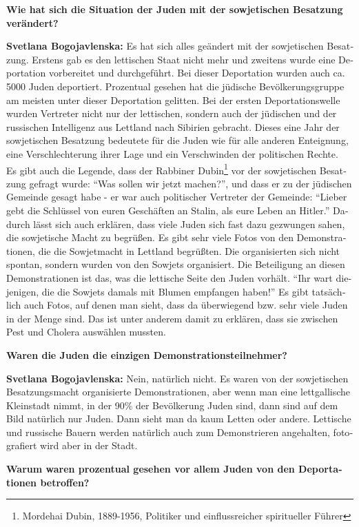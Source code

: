 \begin{otherlanguage}{ngerman}
\textbf{Wie hat sich die Situation der Juden mit der sowjetischen Besatzung verändert?}

\textbf{Svetlana Bogojavlenska:} Es hat sich alles geändert mit der sowjetischen Besatzung. Erstens gab es den lettischen Staat nicht mehr und zweitens wurde eine Deportation vorbereitet und durchgeführt. Bei dieser Deportation wurden auch ca. 5000 Juden deportiert. Prozentual gesehen hat die jüdische Bevölkerungsgruppe am meisten unter dieser Deportation gelitten. Bei der ersten Deportationswelle wurden Vertreter nicht nur der lettischen, sondern auch der jüdischen und der russischen Intelligenz aus Lettland nach Sibirien gebracht. Dieses eine Jahr der sowjetischen Besatzung bedeutete für die Juden wie für alle anderen Enteignung, eine Verschlechterung ihrer Lage und ein Verschwinden der politischen Rechte.\\ 
Es gibt auch die Legende, dass der Rabbiner Dubin\footnote{Mordehai Dubin, 1889-1956, Politiker und einflussreicher spiritueller Führer} vor der sowjetischen Besatzung gefragt wurde: "`Was sollen wir jetzt machen?"', und dass er zu der jüdischen Gemeinde gesagt habe - er war auch politischer Vertreter der Gemeinde: "`Lieber gebt die Schlüssel von euren Geschäften an Stalin, als eure Leben an Hitler."' Dadurch lässt sich auch erklären, dass viele Juden sich fast dazu gezwungen sahen, die sowjetische Macht zu begrüßen. Es gibt sehr viele Fotos von den Demonstrationen, die die Sowjetmacht in Lettland begrüßten. Die organisierten sich nicht spontan, sondern wurden von den Sowjets organisiert. Die Beteiligung an diesen Demonstrationen ist das, was die lettische Seite den Juden vorhält. "`Ihr wart diejenigen, die die Sowjets damals mit Blumen empfangen haben!"' Es gibt tatsächlich auch Fotos, auf denen man sieht, dass da überwiegend bzw. sehr viele Juden in der Menge sind. Das ist unter anderem damit zu erklären, dass sie zwischen Pest und Cholera auswählen mussten. 

\textbf{Waren die Juden die einzigen Demonstrationsteilnehmer?}

\textbf{Svetlana Bogojavlenska:} Nein, natürlich nicht. Es waren von der sowjetischen Besatzungsmacht organisierte Demonstrationen, aber wenn man eine lettgallische Kleinstadt nimmt, in der 90\% der Bevölkerung Juden sind, dann sind auf dem Bild natürlich nur Juden. Dann sieht man da kaum Letten oder andere. Lettische und russische Bauern werden natürlich auch zum Demonstrieren angehalten, fotografiert wird aber in der Stadt.

\textbf{Warum waren prozentual gesehen vor allem Juden von den Deportationen betroffen?}


\end{otherlanguage}
